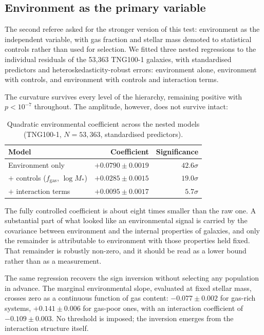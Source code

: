 \documentclass[12pt,a4paper]{article}
\begin{document}
\subsection{Environment as the primary variable}

The second referee asked for the stronger version of this test: environment as the independent variable, with gas fraction and stellar mass demoted to statistical controls rather than used for selection. We fitted three nested regressions to the individual residuals of the 53{,}363 TNG100-1 galaxies, with standardised predictors and heteroskedasticity-robust errors: environment alone, environment with controls, and environment with controls and interaction terms.

The curvature survives every level of the hierarchy, remaining positive with $p < 10^{-7}$ throughout. The amplitude, however, does not survive intact:

\begin{table}[H]
\centering
\caption{Quadratic environmental coefficient across the nested models (TNG100-1, $N = 53{,}363$, standardised predictors).}
\begin{tabular}{lrr}
\toprule
\textbf{Model} & \textbf{Coefficient} & \textbf{Significance} \\
\midrule
Environment only & $+0.0790 \pm 0.0019$ & $42.6\sigma$ \\
$+$ controls ($f_{\mathrm{gas}}$, $\log M_*$) & $+0.0285 \pm 0.0015$ & $19.0\sigma$ \\
$+$ interaction terms & $+0.0095 \pm 0.0017$ & $5.7\sigma$ \\
\bottomrule
\end{tabular}
\end{table}

The fully controlled coefficient is about eight times smaller than the raw one. A substantial part of what looked like an environmental signal is carried by the covariance between environment and the internal properties of galaxies, and only the remainder is attributable to environment with those properties held fixed. That remainder is robustly non-zero, and it should be read as a lower bound rather than as a measurement.

The same regression recovers the sign inversion without selecting any population in advance. The marginal environmental slope, evaluated at fixed stellar mass, crosses zero as a continuous function of gas content: $-0.077 \pm 0.002$ for gas-rich systems, $+0.141 \pm 0.006$ for gas-poor ones, with an interaction coefficient of $-0.109 \pm 0.003$. No threshold is imposed; the inversion emerges from the interaction structure itself.
\end{document}
